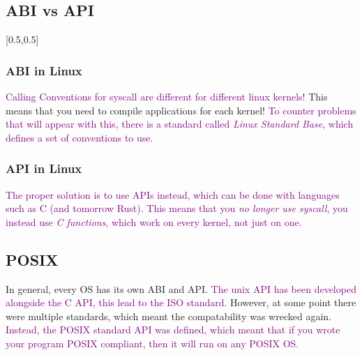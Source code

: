 \documentclass[main.tex,fontsize=8pt,paper=a4,paper=portrait,DIV=calc,]{scrartcl}
\begin{document}
\subsection{ABI vs API}
[0.5,0.5]

\subsubsection{ABI in Linux}
\textcolor{purple}{Calling Conventions for syscall are different for different linux kernels!}\newline
This means that you need to compile applications for each kernel!\newline
\textcolor{purple}{To counter problems that will appear with this, there is a standard called \emph{Linux Standard Base}, which defines a set of conventions to use.}

\subsubsection{API in Linux}
\textcolor{purple}{The proper solution is to use APIs instead, which can be done with languages such as C (and tomorrow Rust).\newline
This means that you \emph{no longer use syscall}, you instead use \emph{C functions}, which work on every kernel, not just on one.}

\subsection{POSIX}
In general, every OS has its own ABI and API.\newline
\textcolor{purple}{The unix API has been developed alongside the C API, this lead to the ISO standard.}\newline
However, at some point there were multiple standards, which meant the compatability was wrecked again.\newline
\textcolor{purple}{Instead, the POSIX standard API was defined, which meant that if you wrote your program POSIX compliant, then it will run on any POSIX OS.}
\end{document}
